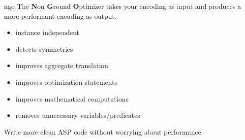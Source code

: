 \begin{frame}{ngo}
The \textbf{N}on \textbf{G}round \textbf{O}ptimizer takes your encoding as input
and produces a more performant encoding as output.
  \begin{itemize}
  \item instance independent
  \item detects symmetries
  \item improves aggregate translation
  \item improves optimization statements
  \item improves mathematical computations
  \item removes unnecessary variables/predicates
  \end{itemize}
Write more clean ASP code without worrying about performance.
\end{frame}
%
